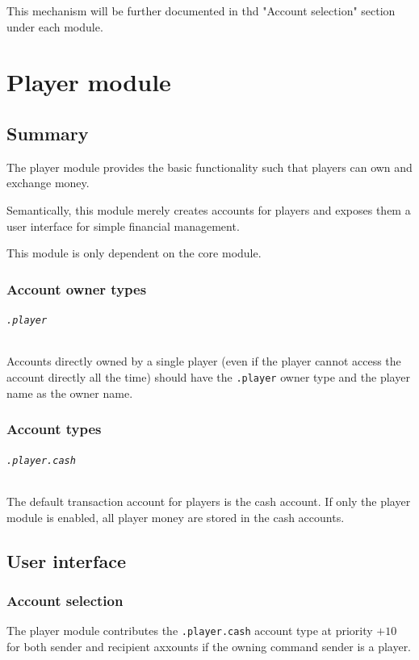 \documentclass{report}
\begin{document}
				This mechanism will be further documented in thd "Account selection" section under each module.

	\part{Player module}
		\chapter{Summary}

			The player module provides the basic functionality such that players can own and exchange money.

			Semantically, this module merely creates accounts for players and exposes them a user interface for simple financial management.

			This module is only dependent on the core module.

			\section{Account owner types}
				\paragraph{\texttt{.player}}
					Accounts directly owned by a single player (even if the player cannot access the account directly all the time)
					should have the \texttt{.player} owner type and the player name as the owner name.

			\section{Account types}
				\paragraph{\texttt{.player.cash}}
					The default transaction account for players is the cash account.
					If only the player module is enabled, all player money are stored in the cash accounts.

		\chapter{User interface}
			\section{Account selection}
				The player module contributes the \texttt{.player.cash} account type at priority $+10$
				for both sender and recipient axxounts if the owning command sender is a player.
\end{document}

